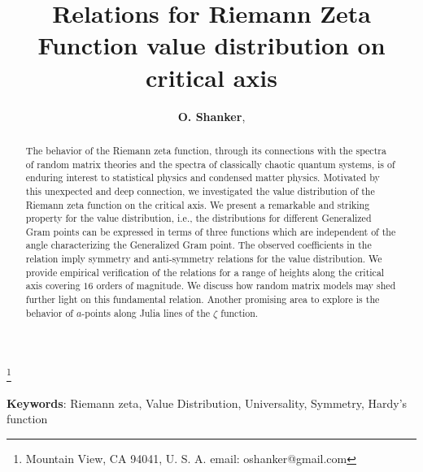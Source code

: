 \documentclass[twoside]{article}
\begin{document}


\newtheorem{theorem}{Theorem}[section]
\newtheorem{lemma}[theorem]{Lemma}

\theoremstyle{definition}
\newtheorem{definition}[theorem]{Definition}
\newtheorem{example}[theorem]{Example}
\newtheorem{xca}[theorem]{Exercise}

\theoremstyle{remark}
\newtheorem{remark}[theorem]{Remark}



\date{}
\lhead[]{}
\rhead[]{}

\title{\bf{Relations for Riemann Zeta Function value distribution on critical axis}}

\maketitle


\author{{\textbf{O. Shanker}},}
\thanks{ Mountain View, CA 94041, U. S. A. email: oshanker@gmail.com}

\thispagestyle{fancy}

\begin{abstract}
The behavior of the Riemann zeta function, through its connections with
the spectra of random matrix theories and the spectra of classically 
chaotic quantum systems, is of enduring interest to 
statistical physics and condensed matter physics. Motivated by this unexpected and 
deep connection, we investigated
the value distribution of the Riemann zeta function on the critical axis.
We present a remarkable and striking  property for the value distribution,
i.e., the distributions for different Generalized Gram points can be expressed in terms
of three functions which are independent of the angle characterizing 
the Generalized Gram point.  The observed coefficients 
in the  relation imply
symmetry and anti-symmetry relations for the value distribution.
We provide empirical verification of the relations for a range of heights along the critical
axis covering $16$ orders of magnitude. We discuss how random matrix models may shed further
light on this fundamental relation. Another promising area to explore is the behavior
of $a$-points along Julia lines of the $\zeta$ function.

\end{abstract}
{\textbf {Keywords}:} Riemann zeta, Value Distribution, Universality, Symmetry, Hardy's function
\\
\end{document}
